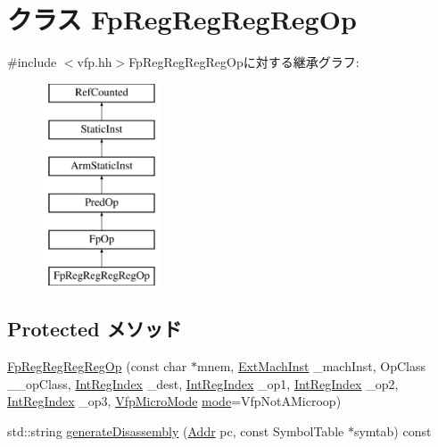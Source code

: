 \hypertarget{classArmISA_1_1FpRegRegRegRegOp}{
\section{クラス FpRegRegRegRegOp}
\label{classArmISA_1_1FpRegRegRegRegOp}
}


{\ttfamily \#include $<$vfp.hh$>$}FpRegRegRegRegOpに対する継承グラフ:\begin{figure}[H]
\begin{center}
\leavevmode
\includegraphics[height=6cm]{classArmISA_1_1FpRegRegRegRegOp}
\end{center}
\end{figure}
\subsection*{Protected メソッド}
\begin{DoxyCompactItemize}
\item 
\hyperlink{classArmISA_1_1FpRegRegRegRegOp_a8e23df532b84bdaaa2e4bc243a1068fd}{FpRegRegRegRegOp} (const char $\ast$mnem, \hyperlink{classStaticInst_a5605d4fc727eae9e595325c90c0ec108}{ExtMachInst} \_\-machInst, OpClass \_\-\_\-opClass, \hyperlink{namespaceArmISA_ae64680ba9fb526106829d6bf92fc791b}{IntRegIndex} \_\-dest, \hyperlink{namespaceArmISA_ae64680ba9fb526106829d6bf92fc791b}{IntRegIndex} \_\-op1, \hyperlink{namespaceArmISA_ae64680ba9fb526106829d6bf92fc791b}{IntRegIndex} \_\-op2, \hyperlink{namespaceArmISA_ae64680ba9fb526106829d6bf92fc791b}{IntRegIndex} \_\-op3, \hyperlink{namespaceArmISA_ad386ea556acd7cd538c64e2d73933714}{VfpMicroMode} \hyperlink{namespaceArmISA_a5f3b9b97eb2dfa29d33e74878455f90d}{mode}=VfpNotAMicroop)
\item 
std::string \hyperlink{classArmISA_1_1FpRegRegRegRegOp_a95d323a22a5f07e14d6b4c9385a91896}{generateDisassembly} (\hyperlink{classm5_1_1params_1_1Addr}{Addr} pc, const SymbolTable $\ast$symtab) const 
\end{DoxyCompactItemize}
